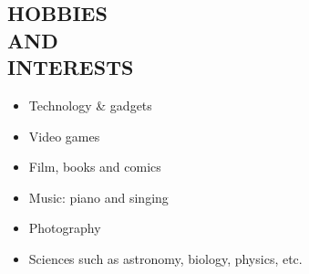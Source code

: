 \documentclass[margin]{res}
\begin{document}
\begin{resume}
		\section{HOBBIES \\ AND \\ INTERESTS}
			\begin{itemize}
		    	\item[] Technology \& gadgets
				\item[] Video games
				\item[] Film, books and comics
				\item[] Music: piano and singing
				\item[] Photography
				\item[] Sciences such as astronomy, biology, physics, etc.
			\end{itemize}
	\end{resume}
\end{document}
